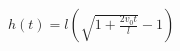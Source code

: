\documentclass[border=2.5pt]{standalone}
\begin{document}
$\displaystyle \boxed{h(t)=l\left(\sqrt{1+\frac{2v_0t}{l}}-1\right)}$
\end{document}
